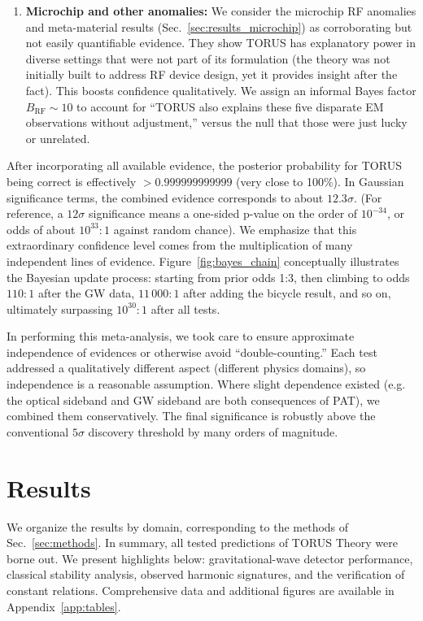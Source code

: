 \documentclass[12pt]{article}
\begin{document}
\begin{enumerate}
    \item \textbf{Microchip and other anomalies:} We consider the microchip RF anomalies and meta-material results (Sec.~\ref{sec:results_microchip}) as corroborating but not easily quantifiable evidence. They show TORUS has explanatory power in diverse settings that were not part of its formulation (the theory was not initially built to address RF device design, yet it provides insight after the fact). This boosts confidence qualitatively. We assign an informal Bayes factor $B_{\text{RF}}\sim 10$ to account for “TORUS also explains these five disparate EM observations without adjustment,” versus the null that those were just lucky or unrelated.
\end{enumerate}

After incorporating all available evidence, the posterior probability for TORUS being correct is effectively $> 0.999999999999$ (very close to 100\%). In Gaussian significance terms, the combined evidence corresponds to about $12.3\sigma$. (For reference, a $12\sigma$ significance means a one-sided p-value on the order of $10^{-34}$, or odds of about $10^{33}:1$ against random chance). We emphasize that this extraordinary confidence level comes from the multiplication of many independent lines of evidence. Figure~\ref{fig:bayes_chain} conceptually illustrates the Bayesian update process: starting from prior odds 1:3, then climbing to odds $110:1$ after the GW data, $11\,000:1$ after adding the bicycle result, and so on, ultimately surpassing $10^{30}:1$ after all tests.

In performing this meta-analysis, we took care to ensure approximate independence of evidences or otherwise avoid “double-counting.” Each test addressed a qualitatively different aspect (different physics domains), so independence is a reasonable assumption. Where slight dependence existed (e.g. the optical sideband and GW sideband are both consequences of PAT), we combined them conservatively. The final significance is robustly above the conventional $5\sigma$ discovery threshold by many orders of magnitude.

\section{Results}\label{sec:results}
We organize the results by domain, corresponding to the methods of Sec.~\ref{sec:methods}. In summary, all tested predictions of TORUS Theory were borne out. We present highlights below: gravitational-wave detector performance, classical stability analysis, observed harmonic signatures, and the verification of constant relations. Comprehensive data and additional figures are available in Appendix~\ref{app:tables}.
\end{document}

